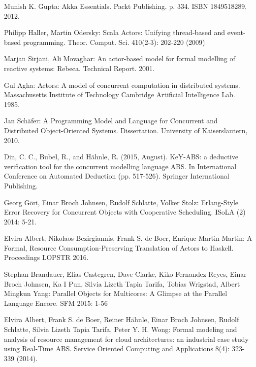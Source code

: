 \documentclass[runningheads,a4paper]{llncs}
\begin{document}
	
	
	
	
	\begin{thebibliography}{4}

  Munish K. Gupta:  Akka Essentials. Packt Publishing. p. 334. ISBN 1849518289, 2012.


 Philipp Haller, Martin Odersky:
Scala Actors: Unifying thread-based and event-based programming. Theor. Comput. Sci. 410(2-3): 202-220 (2009)

 Marjan  Sirjani, Ali Movaghar:
An actor-based model for formal modelling of reactive systems: Rebeca.
Technical Report. 2001.

    Gul Agha: Actors: A model of concurrent computation in distributed systems. Massachusetts Institute of Technology Cambridge Artificial Intelligence Lab.
1985.

 Jan Sch\"{a}fer:  A Programming Model and Language for Concurrent and Distributed Object-Oriented Systems. 
Dissertation. University of Kaiserslautern, 2010. 

Din, C. C., Bubel, R., and Hähnle, R. (2015, August). KeY-ABS: a deductive verification tool for the concurrent modelling language ABS. In International Conference on Automated Deduction (pp. 517-526). Springer International Publishing.

Georg G\"{o}ri, Einar Broch Johnsen, Rudolf Schlatte, Volker Stolz:
Erlang-Style Error Recovery for Concurrent Objects with Cooperative Scheduling. ISoLA (2) 2014: 5-21.

 	Elvira Albert, Nikolaos Bezirgiannis, Frank S. de Boer, Enrique Martin-Martin:
A Formal, Resource Consumption-Preserving Translation of Actors to Haskell. 
Proceedings LOPSTR 2016.

Stephan Brandauer, Elias Castegren, Dave Clarke, Kiko Fernandez-Reyes, Einar Broch Johnsen, Ka I Pun, Silvia Lizeth Tapia Tarifa, Tobias Wrigstad, Albert Mingkun Yang:
Parallel Objects for Multicores: A Glimpse at the Parallel Language Encore. SFM 2015: 1-56

	Elvira Albert, Frank S. de Boer, Reiner Hähnle, Einar Broch Johnsen, Rudolf Schlatte, Silvia Lizeth Tapia Tarifa, Peter Y. H. Wong:
Formal modeling and analysis of resource management for cloud architectures: an industrial case study using Real-Time ABS. Service Oriented Computing and Applications 8(4): 323-339 (2014).


\end{thebibliography}
\end{document}
